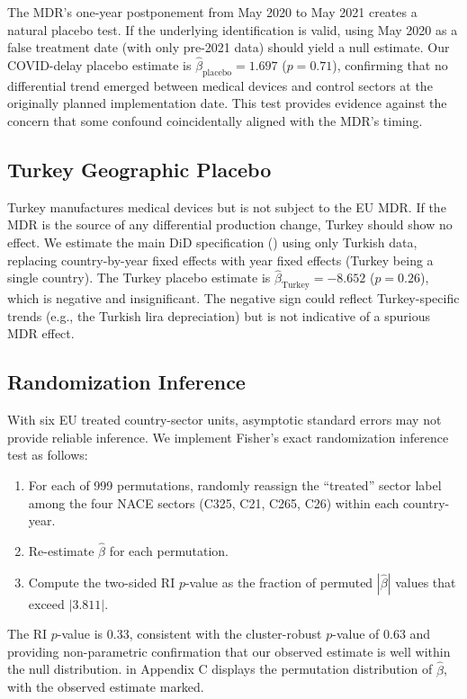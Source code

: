 \documentclass[12pt]{article}
\begin{document}
The MDR's one-year postponement from May 2020 to May 2021 creates a natural placebo test. If the underlying identification is valid, using May 2020 as a false treatment date (with only pre-2021 data) should yield a null estimate. Our COVID-delay placebo estimate is $\hat{\beta}_{\text{placebo}} = 1.697$ ($p = 0.71$), confirming that no differential trend emerged between medical devices and control sectors at the originally planned implementation date. This test provides evidence against the concern that some confound coincidentally aligned with the MDR's timing.

\subsection{Turkey Geographic Placebo}

Turkey manufactures medical devices but is not subject to the EU MDR. If the MDR is the source of any differential production change, Turkey should show no effect. We estimate the main DiD specification () using only Turkish data, replacing country-by-year fixed effects with year fixed effects (Turkey being a single country). The Turkey placebo estimate is $\hat{\beta}_{\text{Turkey}} = -8.652$ ($p = 0.26$), which is negative and insignificant. The negative sign could reflect Turkey-specific trends (e.g., the Turkish lira depreciation) but is not indicative of a spurious MDR effect.

\subsection{Randomization Inference}

With six EU treated country-sector units, asymptotic standard errors may not provide reliable inference. We implement Fisher's exact randomization inference test as follows:
\begin{enumerate}
\item For each of 999 permutations, randomly reassign the ``treated'' sector label among the four NACE sectors (C325, C21, C265, C26) within each country-year.
\item Re-estimate $\hat{\beta}$ for each permutation.
\item Compute the two-sided RI $p$-value as the fraction of permuted $|\hat{\beta}|$ values that exceed $|3.811|$.
\end{enumerate}

The RI $p$-value is 0.33, consistent with the cluster-robust $p$-value of 0.63 and providing non-parametric confirmation that our observed estimate is well within the null distribution.  in Appendix C displays the permutation distribution of $\hat{\beta}$, with the observed estimate marked.
\end{document}
